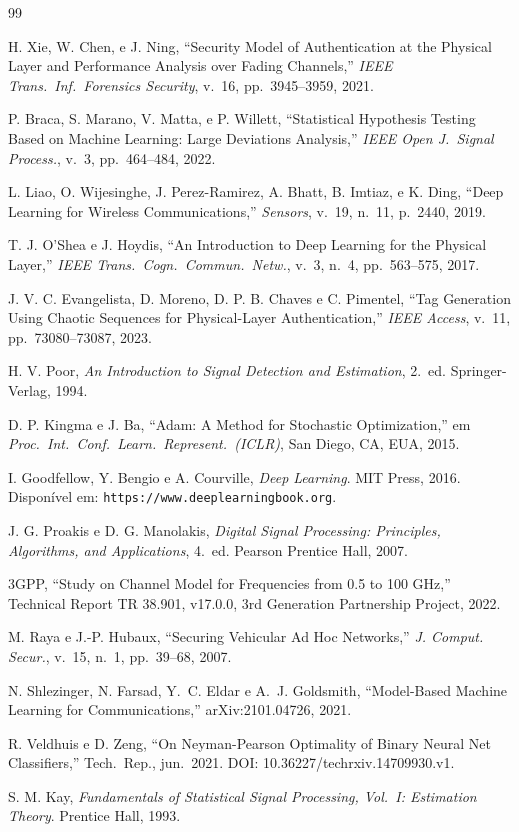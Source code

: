 \documentclass{sbrt}
\begin{document}
\begin{thebibliography}{99}

 H. Xie, W. Chen, e J. Ning, ``Security Model of Authentication at the Physical Layer and Performance Analysis over Fading Channels,'' \textit{IEEE Trans.\ Inf.\ Forensics Security}, v.~16, pp.~3945--3959, 2021.

 P. Braca, S. Marano, V. Matta, e P. Willett, ``Statistical Hypothesis Testing Based on Machine Learning: Large Deviations Analysis,'' \textit{IEEE Open J.\ Signal Process.}, v.~3, pp.~464--484, 2022.

 L. Liao, O. Wijesinghe, J. Perez-Ramirez, A. Bhatt, B. Imtiaz, e K. Ding, ``Deep Learning for Wireless Communications,'' \textit{Sensors}, v.~19, n.~11, p.~2440, 2019.

 T. J. O'Shea e J. Hoydis, ``An Introduction to Deep Learning for the Physical Layer,'' \textit{IEEE Trans.\ Cogn.\ Commun.\ Netw.}, v.~3, n.~4, pp.~563--575, 2017.

 J. V. C. Evangelista, D. Moreno, D. P. B. Chaves e C. Pimentel, ``Tag Generation Using Chaotic Sequences for Physical-Layer Authentication,'' \textit{IEEE Access}, v.~11, pp.~73080--73087, 2023.

 H. V. Poor, \textit{An Introduction to Signal Detection and Estimation}, 2.~ed. Springer-Verlag, 1994.

 D. P. Kingma e J. Ba, ``Adam: A Method for Stochastic Optimization,'' em \textit{Proc.\ Int.\ Conf.\ Learn.\ Represent.\ (ICLR)}, San Diego, CA, EUA, 2015.

 I. Goodfellow, Y. Bengio e A. Courville, \textit{Deep Learning}. MIT Press, 2016. Disponível em: \texttt{https://www.deeplearningbook.org}.

 J. G. Proakis e D. G. Manolakis, \textit{Digital Signal Processing: Principles, Algorithms, and Applications}, 4.~ed. Pearson Prentice Hall, 2007.

 3GPP, ``Study on Channel Model for Frequencies from 0.5 to 100 GHz,'' Technical Report TR 38.901, v17.0.0, 3rd Generation Partnership Project, 2022.

 M. Raya e J.-P. Hubaux, ``Securing Vehicular Ad Hoc Networks,'' \textit{J. Comput. Secur.}, v.~15, n.~1, pp.~39--68, 2007.

 N. Shlezinger, N. Farsad, Y.~C. Eldar e A.~J. Goldsmith, ``Model-Based Machine Learning for Communications,'' arXiv:2101.04726, 2021.

 R. Veldhuis e D. Zeng, ``On Neyman-Pearson Optimality of Binary Neural Net Classifiers,'' Tech.\ Rep., jun.\ 2021. DOI: 10.36227/techrxiv.14709930.v1.

 S. M. Kay, \textit{Fundamentals of Statistical Signal Processing, Vol.~I: Estimation Theory}. Prentice Hall, 1993.

\end{thebibliography}
\end{document}

